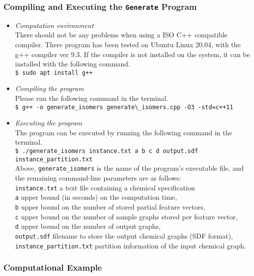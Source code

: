 \documentclass[11pt,titlepage,dvipdfmx,twoside]{article}
\begin{document}
\subsubsection{Compiling and Executing the {\tt Generate} Program}
\label{sec:compile_m}
\begin{itemize}
	\item {\em Computation environment}\\
		There should not be any problems when using a ISO C++ compatible compiler. %
		There program has been tested on 
		Ubuntu Linux 20.04,  with the  g++ compiler ver 9.3.
		If the compiler is not installed on the system, it can be installed with
		the following command.\\
		\verb|$ sudo apt install g++|
	\item {\em Compiling the program}\\
		Please run the following command in the terminal.\\
		\verb|$ g++ -o generate_isomers generate\_isomers.cpp -O3 -std=c++11|\\
	\item {\em Executing the program}\\
		The program can be executed by running the following command in the terminal.\\
		\verb|$ ./generate_isomers instance.txt a b c d output.sdf instance_partition.txt|\\
		Above, {\tt generate\_isomers} is the name of the program's executable file, and the remaining command-line
		parameters are as follows: \\
		\verb|instance.txt|  a text file containing a chemical specification \\
		\verb|a| upper bound (in seconds) on the computation time, \\
		\verb|b| upper bound on the number of stored partial feature vectors, \\
		\verb|c| upper bound on the number of sample graphs stored per feature vector, \\
		\verb|d| upper bound on the number of output graphs, \\
		\verb|output.sdf| filename to store the output chemical graphs (SDF format), \\
		\verb|instance_partition.txt|  partition information of the input chemical graph.
\end{itemize}


\subsubsection{Computational Example}
\label{sec:instance_p}
\end{document}
